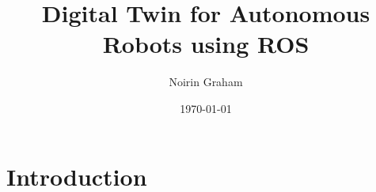 \documentclass[11pt, english]{report} %
\title{Digital Twin for Autonomous Robots using ROS}
\author{Noirin Graham}
\date{\today}
\begin{document}
\maketitle

\tableofcontents
\newpage

\listoffigures
\newpage

\listoftables
\newpage


\chapter{Introduction}

\end{document}
